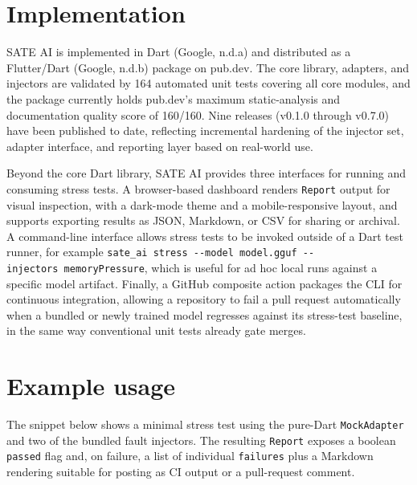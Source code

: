 \documentclass[
  11pt,
]{article}
\begin{document}
\hypertarget{implementation}{%
\section{Implementation}\label{implementation}}

SATE AI is implemented in Dart (Google, n.d.a) and distributed as a
Flutter/Dart (Google, n.d.b) package on pub.dev. The core library,
adapters, and injectors are validated by 164 automated unit tests
covering all core modules, and the package currently holds pub.dev's
maximum static-analysis and documentation quality score of 160/160. Nine
releases (v0.1.0 through v0.7.0) have been published to date, reflecting
incremental hardening of the injector set, adapter interface, and
reporting layer based on real-world use.

Beyond the core Dart library, SATE AI provides three interfaces for
running and consuming stress tests. A browser-based dashboard renders
\texttt{Report} output for visual inspection, with a dark-mode theme and
a mobile-responsive layout, and supports exporting results as JSON,
Markdown, or CSV for sharing or archival. A command-line interface
allows stress tests to be invoked outside of a Dart test runner, for
example
\texttt{sate\_ai\ stress\ -\/-model\ model.gguf\ -\/-injectors\ memoryPressure},
which is useful for ad hoc local runs against a specific model artifact.
Finally, a GitHub composite action packages the CLI for continuous
integration, allowing a repository to fail a pull request automatically
when a bundled or newly trained model regresses against its stress-test
baseline, in the same way conventional unit tests already gate merges.

\hypertarget{example-usage}{%
\section{Example usage}\label{example-usage}}

The snippet below shows a minimal stress test using the pure-Dart
\texttt{MockAdapter} and two of the bundled fault injectors. The
resulting \texttt{Report} exposes a boolean \texttt{passed} flag and, on
failure, a list of individual \texttt{failures} plus a Markdown
rendering suitable for posting as CI output or a pull-request comment.
\end{document}
